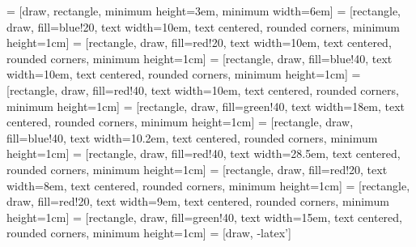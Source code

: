  = [draw, rectangle, 
    minimum height=3em, minimum width=6em]
\newcommand*\circled[1]{\tikz[baseline=(char.base)]{
            \node[shape=circle,draw,inner sep=2pt] (char) {#1};}}
 = [rectangle, draw, fill=blue!20, 
text width=10em, text centered, rounded corners, minimum height=1cm]
 = [rectangle, draw, fill=red!20, 
text width=10em, text centered, rounded corners, minimum height=1cm]
 = [rectangle, draw, fill=blue!40, 
text width=10em, text centered, rounded corners, minimum height=1cm]
 = [rectangle, draw, fill=red!40, 
text width=10em, text centered, rounded corners, minimum height=1cm]
 = [rectangle, draw, fill=green!40, 
text width=18em, text centered, rounded corners, minimum height=1cm]
 = [rectangle, draw, fill=blue!40, 
text width=10.2em, text centered, rounded corners, minimum height=1cm]
 = [rectangle, draw, fill=red!40, 
text width=28.5em, text centered, rounded corners, minimum height=1cm]
 = [rectangle, draw, fill=red!20, 
text width=8em, text centered, rounded corners, minimum height=1cm]
 = [rectangle, draw, fill=red!20, 
text width=9em, text centered, rounded corners, minimum height=1cm]
 = [rectangle, draw, fill=green!40, 
text width=15em, text centered, rounded corners, minimum height=1cm]
 = [draw, -latex']       
\usepackage{hyperref}			%
